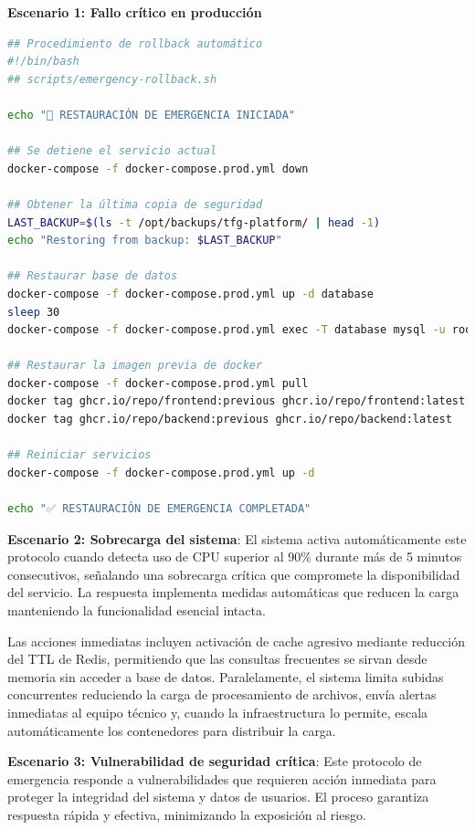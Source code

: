 \documentclass[12pt,a4paper,oneside]{report}
\begin{document}
\textbf{Escenario 1: Fallo crítico en producción}

\begin{lstlisting}[language=bash]
## Procedimiento de rollback automático
#!/bin/bash
## scripts/emergency-rollback.sh

echo "🚨 RESTAURACIÓN DE EMERGENCIA INICIADA"

## Se detiene el servicio actual
docker-compose -f docker-compose.prod.yml down

## Obtener la última copia de seguridad
LAST_BACKUP=$(ls -t /opt/backups/tfg-platform/ | head -1)
echo "Restoring from backup: $LAST_BACKUP"

## Restaurar base de datos
docker-compose -f docker-compose.prod.yml up -d database
sleep 30
docker-compose -f docker-compose.prod.yml exec -T database mysql -u root -p$DB_ROOT_PASSWORD tfg_production < /opt/backups/tfg-platform/$LAST_BACKUP/database.sql

## Restaurar la imagen previa de docker
docker-compose -f docker-compose.prod.yml pull
docker tag ghcr.io/repo/frontend:previous ghcr.io/repo/frontend:latest
docker tag ghcr.io/repo/backend:previous ghcr.io/repo/backend:latest

## Reiniciar servicios
docker-compose -f docker-compose.prod.yml up -d

echo "✅ RESTAURACIÓN DE EMERGENCIA COMPLETADA"
\end{lstlisting}

\textbf{Escenario 2: Sobrecarga del sistema}: El sistema activa automáticamente este protocolo cuando detecta uso de CPU superior al 90\% durante más de 5 minutos consecutivos, señalando una sobrecarga crítica que compromete la disponibilidad del servicio. La respuesta implementa medidas automáticas que reducen la carga manteniendo la funcionalidad esencial intacta.

Las acciones inmediatas incluyen activación de cache agresivo mediante reducción del TTL de Redis, permitiendo que las consultas frecuentes se sirvan desde memoria sin acceder a base de datos. Paralelamente, el sistema limita subidas concurrentes reduciendo la carga de procesamiento de archivos, envía alertas inmediatas al equipo técnico y, cuando la infraestructura lo permite, escala automáticamente los contenedores para distribuir la carga.

\textbf{Escenario 3: Vulnerabilidad de seguridad crítica}: Este protocolo de emergencia responde a vulnerabilidades que requieren acción inmediata para proteger la integridad del sistema y datos de usuarios. El proceso garantiza respuesta rápida y efectiva, minimizando la exposición al riesgo.
\end{document}
